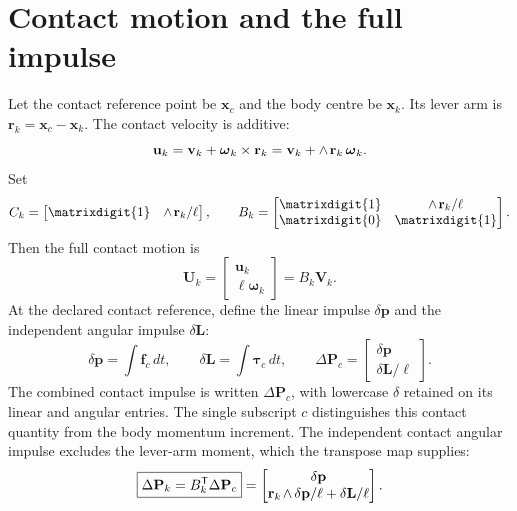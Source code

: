 \documentclass[11pt,a4paper]{article}
\newcommand{\rw}[1]{\mathord{#1\mkern2mu\wedge}}
\newcommand{\lwedge}[1]{\mathord{\wedge\mkern2mu#1}}
\newcommand{\id}{\matrixdigit{1}}
\newcommand{\zmat}{\matrixdigit{0}}
\begin{document}
\section{Contact motion and the full impulse}
Let the contact reference point be $\mathbf{x}_c$ and the body centre be $\mathbf{x}_k$. Its lever arm is $\mathbf{r}_k=\mathbf{x}_c-\mathbf{x}_k$. The contact velocity is additive:
\begin{equation}
\mathbf{u}_k=\mathbf{v}_k+\boldsymbol{\omega}_k\times \mathbf{r}_k
=\mathbf{v}_k+\lwedge{\mathbf{r}_k}\,\boldsymbol{\omega}_k.
\end{equation}
Set
\begin{equation}
C_k=\begin{bmatrix}\id&\lwedge{\mathbf{r}_k}/\ell\end{bmatrix},\qquad
B_k=\begin{bmatrix}\id&\lwedge{\mathbf{r}_k}/\ell\\\zmat&\id\end{bmatrix}.
\end{equation}
Then the full contact motion is
\begin{equation}
\mathbf{U}_k=\begin{bmatrix}\mathbf{u}_k\\\ell\boldsymbol{\omega}_k\end{bmatrix}
=B_k\mathbf{V}_k.
\end{equation}
At the declared contact reference, define the linear impulse $\delta \mathbf{p}$ and the independent angular impulse $\delta \mathbf{L}$:
\begin{equation}
\delta \mathbf{p}=\int \mathbf{f}_c\,dt,\qquad
\delta \mathbf{L}=\int\boldsymbol{\tau}_c\,dt,\qquad
\Delta\mathbf{P}_c=\begin{bmatrix}\delta \mathbf{p}\\\delta \mathbf{L}/\ell\end{bmatrix}.
\end{equation}
The combined contact impulse is written $\Delta\mathbf{P}_c$, with lowercase $\delta$ retained on its linear and angular entries. The single subscript $c$ distinguishes this contact quantity from the body momentum increment. The independent contact angular impulse excludes the lever-arm moment, which the transpose map supplies:
\begin{equation}
\boxed{\Delta \mathbf{P}_k=B_k^{\mathsf T}\Delta\mathbf{P}_c}
=\begin{bmatrix}\delta \mathbf{p}\\
\rw{\mathbf{r}_k}\,\delta \mathbf{p}/\ell+\delta \mathbf{L}/\ell\end{bmatrix}.
\end{equation}
\end{document}
